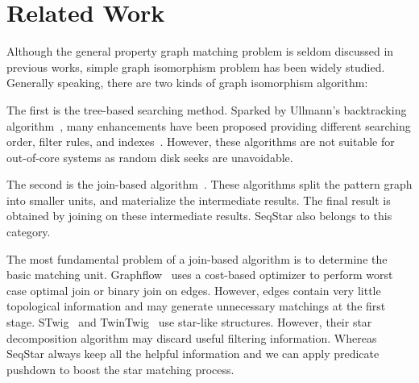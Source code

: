 \section{Related Work}
Although the general property graph matching problem is seldom discussed in previous works,
simple graph isomorphism problem has been widely studied.
Generally speaking, there are two kinds of graph isomorphism algorithm:

The first is the tree-based searching method.
Sparked by Ullmann's backtracking algorithm~\cite{DBLP:journals/jacm/Ullmann76},
many enhancements have been proposed providing different searching order, filter rules, and indexes~\cite{DBLP:journals/pami/CordellaFSV04,DBLP:journals/pvldb/ShangZLY08,DBLP:conf/sigmod/HeS08,DBLP:conf/sigmod/HanLL13,DBLP:journals/pvldb/LeeHKL12}.
However, these algorithms are not suitable for out-of-core systems as random disk seeks are unavoidable.

The second is the join-based algorithm~\cite{DBLP:journals/pvldb/LaiQLC15,DBLP:journals/pvldb/QiaoZC17,DBLP:journals/pvldb/SunWWSL12,DBLP:journals/pvldb/MhedhbiS19,DBLP:journals/pvldb/MhedhbiS19}.
These algorithms split the pattern graph into smaller units,
and materialize the intermediate results.
The final result is obtained by joining on these intermediate results.
SeqStar also belongs to this category.

The most fundamental problem of a join-based algorithm is to determine the basic matching unit.
Graphflow~\cite{DBLP:journals/pvldb/MhedhbiS19} uses a cost-based optimizer to perform worst case optimal join or binary join on edges.
However, edges contain very little topological information and may generate unnecessary matchings at the first stage.
STwig~\cite{DBLP:journals/pvldb/SunWWSL12} and TwinTwig~\cite{DBLP:journals/pvldb/LaiQLC15} use star-like structures.
However, their star decomposition algorithm may discard useful filtering information.
Whereas SeqStar always keep all the helpful information and we can apply predicate pushdown to boost the star matching process.

